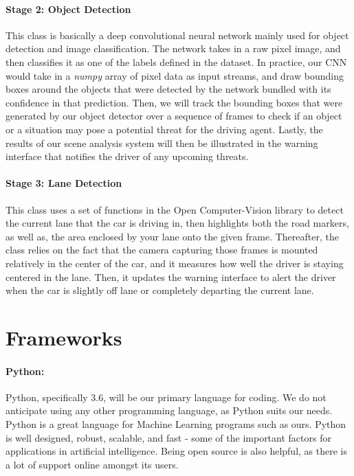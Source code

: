 \paragraph{Stage 2: Object Detection} This class is basically a deep convolutional neural network mainly used for object detection and image classification. The network takes in a raw pixel image, and then classifies it as one of the labels defined in the dataset. In practice, our CNN would take in a \textit{numpy} array of pixel data as input streams, and draw bounding boxes around the objects that were detected by the network bundled with its confidence in that prediction. Then, we will track the bounding boxes that were generated by our object detector over a sequence of frames to check if an object or a situation may pose a potential threat for the driving agent. Lastly, the results of our scene analysis system will then be illustrated in the warning interface that notifies the driver of any upcoming threats.   


\paragraph{Stage 3: Lane Detection} This class uses a set of functions in the Open Computer-Vision library \cite{OpenCV} to detect the current lane that the car is driving in, then highlights both the road markers, as well as, the area enclosed by your lane onto the given frame. Thereafter, the class relies on the fact that the camera capturing those frames is mounted relatively in the center of the car, and it measures how well the driver is staying centered in the lane. Then, it updates the warning interface to alert the driver when the car is slightly off lane or completely departing the current lane.  



\section{Frameworks}
\paragraph{Python:} Python, specifically 3.6, will be our primary language for coding.  We do not anticipate using any other programming language, as Python suits our needs.  Python is a great language for Machine Learning programs such as ours.  Python is well designed, robust, scalable, and fast - some of the important factors for applications in artificial intelligence.  Being open source is also helpful, as there is a lot of support online amongst its users.  
\par

